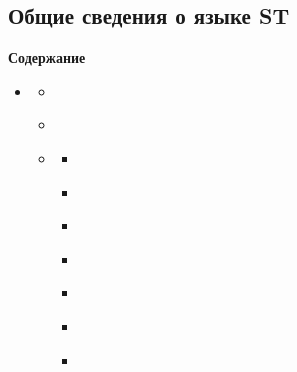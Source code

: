 \documentclass[letterpaper,10pt,russian]{sphinxmanual}
\begin{document}
\subsection{Общие сведения о языке ST}
\label{iec_guide/st_guide::doc}\label{iec_guide/st_guide:st}
\begin{sphinxShadowBox}
\textbf{Содержание}

\medskip

\begin{itemize}
\item {} 
\label{iec_guide/st_guide:id8}{\hyperref[iec_guide/st_guide:st]{}}
\begin{itemize}
\item {} 
\label{iec_guide/st_guide:id9}{\hyperref[iec_guide/st_guide:id2]{}}

\item {} 
\label{iec_guide/st_guide:id10}{\hyperref[iec_guide/st_guide:id3]{}}

\item {} 
\label{iec_guide/st_guide:id11}{\hyperref[iec_guide/st_guide:id4]{}}
\begin{itemize}
\item {} 
\label{iec_guide/st_guide:id12}{\hyperref[iec_guide/st_guide:id5]{}}

\item {} 
\label{iec_guide/st_guide:id13}{\hyperref[iec_guide/st_guide:id6]{}}

\item {} 
\label{iec_guide/st_guide:id14}{\hyperref[iec_guide/st_guide:id7]{}}

\item {} 
\label{iec_guide/st_guide:id15}{\hyperref[iec_guide/st_guide:for]{}}

\item {} 
\label{iec_guide/st_guide:id16}{\hyperref[iec_guide/st_guide:while]{}}

\item {} 
\label{iec_guide/st_guide:id17}{\hyperref[iec_guide/st_guide:repeat\string-until]{}}

\item {} 
\label{iec_guide/st_guide:id18}{\hyperref[iec_guide/st_guide:case]{}}

\end{itemize}

\end{itemize}

\end{itemize}
\end{sphinxShadowBox}
\end{document}
